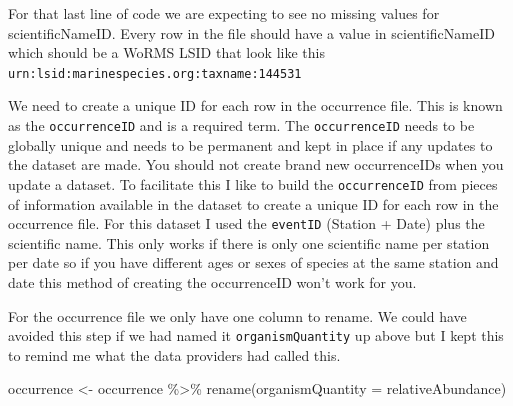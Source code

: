 \documentclass[
]{book}
\newenvironment{Shaded}{\begin{snugshade}}{\end{snugshade}}
\newcommand{\AttributeTok}[1]{\textcolor[rgb]{0.77,0.63,0.00}{#1}}
\newcommand{\DecValTok}[1]{\textcolor[rgb]{0.00,0.00,0.81}{#1}}
\newcommand{\FunctionTok}[1]{\textcolor[rgb]{0.00,0.00,0.00}{#1}}
\newcommand{\NormalTok}[1]{#1}
\newcommand{\OtherTok}[1]{\textcolor[rgb]{0.56,0.35,0.01}{#1}}
\newcommand{\SpecialCharTok}[1]{\textcolor[rgb]{0.00,0.00,0.00}{#1}}
\newcommand{\StringTok}[1]{\textcolor[rgb]{0.31,0.60,0.02}{#1}}
\begin{document}
For that last line of code we are expecting to see no missing values for scientificNameID. Every row in the file should have a value in scientificNameID which should be a WoRMS LSID that look like this \texttt{urn:lsid:marinespecies.org:taxname:144531}

We need to create a unique ID for each row in the occurrence file. This is known as the \texttt{occurrenceID} and is a required term. The \texttt{occurrenceID} needs to be globally unique and needs to be permanent and kept in place if any updates to the dataset are made. You should not create brand new occurrenceIDs when you update a dataset. To facilitate this I like to build the \texttt{occurrenceID} from pieces of information available in the dataset to create a unique ID for each row in the occurrence file. For this dataset I used the \texttt{eventID} (Station + Date) plus the scientific name. This only works if there is only one scientific name per station per date so if you have different ages or sexes of species at the same station and date this method of creating the occurrenceID won't work for you.

\begin{Shaded}
\end{Shaded}

For the occurrence file we only have one column to rename. We could have avoided this step if we had named it \texttt{organismQuantity} up above but I kept this to remind me what the data providers had called this.

\begin{Shaded}
\begin{Highlighting}[]
\NormalTok{occurrence }\OtherTok{\textless{}{-}}\NormalTok{ occurrence }\SpecialCharTok{\%\textgreater{}\%}
  \FunctionTok{rename}\NormalTok{(}\AttributeTok{organismQuantity =}\NormalTok{ relativeAbundance)}
\end{Highlighting}
\end{Shaded}
\end{document}
